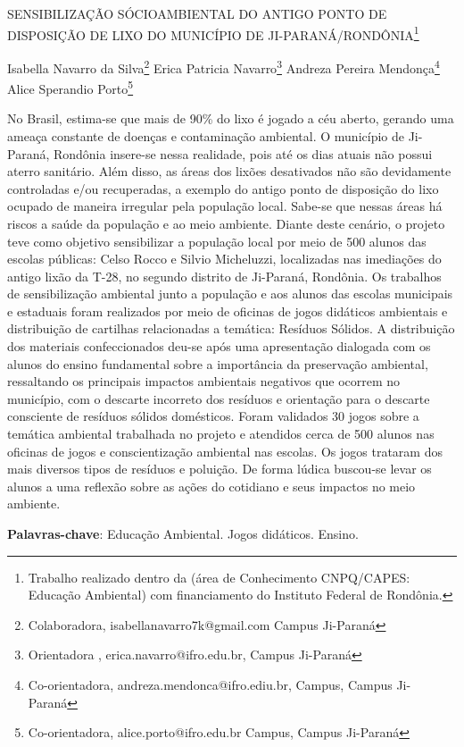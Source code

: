 \documentclass[article,12pt,onesidea,4paper,english,brazil]{abntex2}
\begin{document}
	
	
	\frenchspacing 
	
	\begin{center}
		\LARGE SENSIBILIZAÇÃO SÓCIOAMBIENTAL DO ANTIGO PONTO DE DISPOSIÇÃO DE LIXO DO MUNICÍPIO DE JI-PARANÁ/RONDÔNIA\footnote{Trabalho realizado dentro da (área de Conhecimento CNPQ/CAPES: Educação Ambiental) com financiamento do Instituto Federal de Rondônia.}
		
		\normalsize
		Isabella Navarro da Silva\footnote{Colaboradora, isabellanavarro7k@gmail.com Campus Ji-Paraná} 
		Erica Patricia Navarro\footnote{Orientadora , erica.navarro@ifro.edu.br, Campus Ji-Paraná} 
		Andreza Pereira Mendonça\footnote{Co-orientadora, andreza.mendonca@ifro.ediu.br, Campus, Campus Ji-Paraná} 
		Alice Sperandio Porto\footnote{Co-orientadora, alice.porto@ifro.edu.br Campus, Campus Ji-Paraná} 
	\end{center}
	
	\noindent No Brasil, estima-se que mais de 90\% do lixo é jogado a céu aberto, gerando uma ameaça constante de doenças e contaminação ambiental. O município de Ji-Paraná, Rondônia insere-se nessa realidade, pois até os dias atuais não possui aterro sanitário. Além disso, as áreas dos lixões desativados não são devidamente controladas e/ou recuperadas, a exemplo do antigo ponto de disposição do lixo ocupado de maneira irregular pela população local. Sabe-se que nessas áreas há riscos a saúde da população e ao meio ambiente. Diante deste cenário, o projeto teve como objetivo sensibilizar a população local por meio de 500 alunos das escolas públicas: Celso Rocco e Silvio Micheluzzi, localizadas nas imediações do antigo lixão da T-28, no segundo distrito de Ji-Paraná, Rondônia.  Os trabalhos de sensibilização ambiental junto a população e aos alunos das escolas municipais e estaduais foram realizados por meio de oficinas de jogos didáticos ambientais e distribuição de cartilhas relacionadas a temática: Resíduos Sólidos. A distribuição dos materiais confeccionados deu-se após uma apresentação dialogada com os alunos do ensino fundamental sobre a importância da preservação ambiental, ressaltando os principais impactos ambientais negativos que ocorrem no município, com o descarte incorreto dos resíduos e orientação para o descarte consciente de resíduos sólidos domésticos. Foram validados 30 jogos sobre a temática ambiental trabalhada no projeto e atendidos cerca de 500 alunos nas oficinas de jogos e conscientização ambiental nas escolas. Os jogos trataram dos mais diversos tipos de resíduos e poluição. De forma lúdica buscou-se levar os alunos a uma reflexão sobre as ações do cotidiano e seus impactos no meio ambiente.
	
	\vspace{\onelineskip}
	
	\noindent
	\textbf{Palavras-chave}: Educação Ambiental. Jogos didáticos. Ensino.
	
\end{document}
